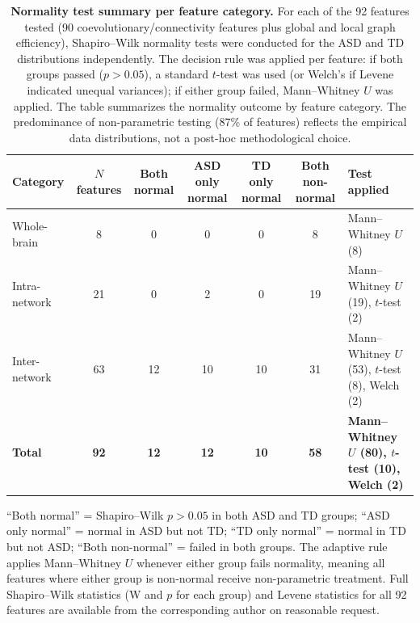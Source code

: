 \documentclass[10pt,letterpaper]{article}
\begin{document}
\begin{table}[htbp]
\centering
\caption{\textbf{Normality test summary per feature category.} For each of the 92 features tested
(90 coevolutionary/connectivity features plus global and local graph efficiency), Shapiro--Wilk
normality tests were conducted for the ASD and TD distributions independently. The decision rule
was applied per feature: if both groups passed ($p > 0.05$), a standard $t$-test was used (or
Welch's if Levene indicated unequal variances); if either group failed, Mann--Whitney $U$ was
applied. The table summarizes the normality outcome by feature category. The predominance of
non-parametric testing (87\% of features) reflects the empirical data distributions, not a
post-hoc methodological choice.}
\label{tab:supp_normality}

\scriptsize
\begin{tabularx}{\textwidth}{lcccccX}
\toprule
\textbf{Category} &
\textbf{$N$ features} &
\textbf{Both normal} &
\textbf{ASD only normal} &
\textbf{TD only normal} &
\textbf{Both non-normal} &
\textbf{Test applied} \\
\midrule
Whole-brain &
8 &
0 &
0 &
0 &
8 &
Mann--Whitney $U$ (8) \\

Intra-network &
21 &
0 &
2 &
0 &
19 &
Mann--Whitney $U$ (19), $t$-test (2) \\

Inter-network &
63 &
12 &
10 &
10 &
31 &
Mann--Whitney $U$ (53), $t$-test (8), Welch (2) \\
\midrule

\textbf{Total} &
\textbf{92} &
\textbf{12} &
\textbf{12} &
\textbf{10} &
\textbf{58} &
\textbf{Mann--Whitney $U$ (80), $t$-test (10), Welch (2)} \\
\bottomrule
\end{tabularx}

\vspace{2mm}

\footnotesize
\begin{minipage}{\textwidth}
``Both normal'' = Shapiro--Wilk $p > 0.05$ in both ASD and TD groups; ``ASD only normal'' =
normal in ASD but not TD; ``TD only normal'' = normal in TD but not ASD; ``Both non-normal'' =
failed in both groups. The adaptive rule applies Mann--Whitney $U$ whenever either group fails
normality, meaning all features where either group is non-normal receive non-parametric treatment.
Full Shapiro--Wilk statistics (W and $p$ for each group) and Levene statistics for all 92 features
are available from the corresponding author on reasonable request.
\end{minipage}

\end{table}
\end{document}
